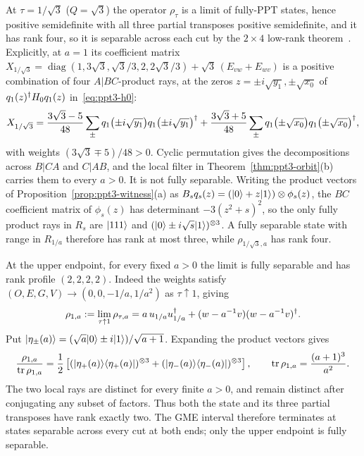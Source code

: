 \begin{remark}\label{rem:ppt3-endpoint}
At $\tau=1/\sqrt3$ ($Q=\sqrt3$) the operator $\rho_\tau$ is a limit of fully-PPT states, hence positive semidefinite with all three
partial transposes positive semidefinite, and it has rank four, so it is separable across each cut by the $2\times4$
low-rank theorem~\cite{KCKL,HLVC}. Explicitly, at $a=1$ its coefficient matrix
$X_{1/\sqrt3}=\operatorname{diag}(1,3\sqrt3,\sqrt3/3,2,2\sqrt3/3)+\sqrt3\,(E_{vw}+E_{wv})$ is a positive combination of four
$A|BC$-product rays, at the zeros $z=\pm i\sqrt{y_1},\pm\sqrt{x_0}$ of $q_1(z)^{\dagger} H_0q_1(z)$ in~\eqref{eq:ppt3-h0}:
\begin{equation}\label{eq:ppt3-lower-endpoint}
 X_{1/\sqrt3}
  =\frac{3\sqrt3-5}{48}\sum_{\pm}q_1\bigl(\pm i\sqrt{y_1}\bigr)q_1\bigl(\pm i\sqrt{y_1}\bigr)^{\dagger}
  +\frac{3\sqrt3+5}{48}\sum_{\pm}q_1\bigl(\pm\sqrt{x_0}\bigr)q_1\bigl(\pm\sqrt{x_0}\bigr)^{\dagger} ,
\end{equation}
with weights $(3\sqrt3\mp5)/48>0$. Cyclic permutation gives the decompositions across $B|CA$ and $C|AB$, and the local filter in
Theorem~\ref{thm:ppt3-orbit}(b) carries them to every $a>0$.
It is not fully separable. Writing the product vectors of Proposition~\ref{prop:ppt3-witness}(a) as
$B_sq_s(z)=(\lvert0\rangle+z\lvert1\rangle)\otimes\phi_s(z)$, the $BC$ coefficient matrix of $\phi_s(z)$ has determinant
$-3(z^2+s)^2$, so the only fully product rays in $R_s$ are $\lvert111\rangle$ and $(\lvert0\rangle\pm i\sqrt s\lvert1\rangle)^{\otimes3}$.
A fully separable state with range in $R_{1/a}$ therefore has rank at most three, while $\rho_{1/\sqrt3,a}$ has rank four.

At the upper endpoint, for every fixed $a>0$ the limit is fully separable and has rank profile $(2,2,2,2)$.
Indeed the weights satisfy $(O,E,G,V)\to(0,0,-1/a,1/a^2)$ as $\tau\uparrow1$, giving
\[
 \rho_{1,a}:=\lim_{\tau\uparrow1}\rho_{\tau,a}
    =a\,u_{1/a}u_{1/a}^{\dagger}+(w-a^{-1}v)(w-a^{-1}v)^{\dagger}.
\]
Put $\lvert\eta_\pm(a)\rangle=(\sqrt a\lvert0\rangle\pm i\lvert1\rangle)/\sqrt{a+1}$. Expanding the product vectors gives
\begin{equation}\label{eq:ppt3-upper-endpoint}
 \frac{\rho_{1,a}}{\operatorname{tr} \rho_{1,a}}
   =\frac12\left[
     (\lvert\eta_+(a)\rangle\langle\eta_+(a)\rvert)^{\otimes3}
    +(\lvert\eta_-(a)\rangle\langle\eta_-(a)\rvert)^{\otimes3}\right],
 \qquad \operatorname{tr} \rho_{1,a}=\frac{(a+1)^3}{a^2}.
\end{equation}
The two local rays are distinct for every finite $a>0$, and remain distinct after conjugating any subset of
factors. Thus both the state and its three partial transposes have rank exactly two. The GME interval therefore
terminates at states separable across every cut at both ends; only the upper endpoint is fully separable.


\end{remark}
